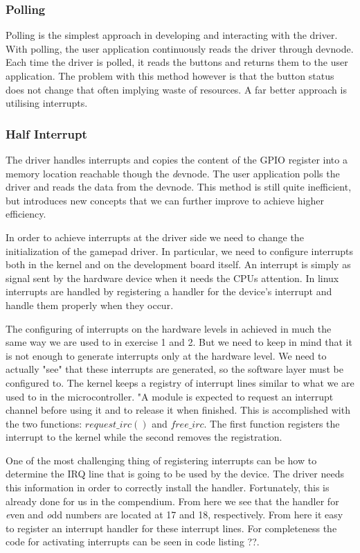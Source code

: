   



\subsubsection{Polling}
Polling is the simplest approach in developing and interacting with the driver. With polling, the user application continuously reads the driver through devnode. Each time the driver is polled, it reads the buttons and returns them to the user application. The problem with this method however is that the button status does not change that often implying waste of resources. A far better approach is utilising interrupts. 


\subsubsection{Half Interrupt}
The driver handles interrupts and copies the content of the GPIO register into a memory location reachable though the {\emph devnode}. The user application polls the driver and reads the data from the devnode. This method is still quite inefficient, but introduces new concepts that we can further improve to achieve higher efficiency. 

In order to achieve interrupts at the driver side we need to change the initialization of the gamepad driver. In particular, we need to configure interrupts both in the kernel and on the development board itself. An interrupt is simply as signal sent by the hardware device when it needs the CPUs attention. In linux interrupts are handled by registering a handler for the device's interrupt and handle them properly when they occur. 

The configuring of interrupts on the hardware levels in achieved in much the same way we are used to 
in exercise 1 and 2. But we need to keep in mind that it is not enough to generate interrupts only at the hardware level. We need to actually "see" that these interrupts are generated, so the software layer must be configured to. The kernel keeps a registry of interrupt lines similar to what we are used to in the microcontroller. "A module is expected to request an interrupt channel before using it and to release it when finished. This is accomplished with the two functions: $request\_irc()$ and $free\_irc$. The first function registers the interrupt to the kernel while the second removes the registration. 

One of the most challenging thing of registering interrupts can be how to determine the IRQ line that is going to be used by the device. The driver needs this information in order to correctly install the handler. Fortunately, this is already done for us in the compendium. From here we see that the handler for {\emph even} and {\emph odd} numbers are located at 17 and 18, respectively. From here it easy to register an interrupt handler for these interrupt lines. For completeness the code for activating interrupts can be seen in code listing ??.


